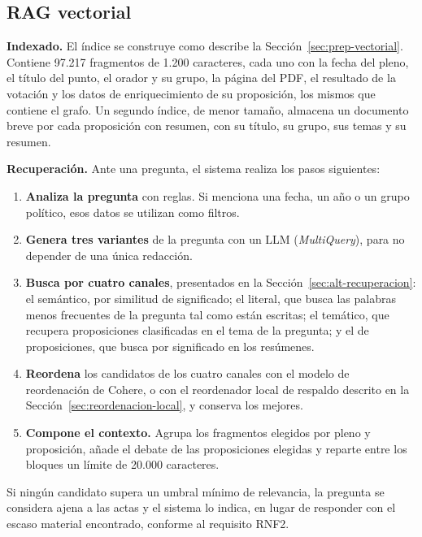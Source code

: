 \documentclass[11pt, a4paper]{report}
\begin{document}
	\subsection{RAG vectorial}
	\label{sec:rag-vectorial}

	\textbf{Indexado.} El índice se construye como describe la Sección~\ref{sec:prep-vectorial}. Contiene 97.217 fragmentos de 1.200 caracteres, cada uno con la fecha del pleno, el título del punto, el orador y su grupo, la página del PDF, el resultado de la votación y los datos de enriquecimiento de su proposición, los mismos que contiene el grafo. Un segundo índice, de menor tamaño, almacena un documento breve por cada proposición con resumen, con su título, su grupo, sus temas y su resumen.

	\textbf{Recuperación.} Ante una pregunta, el sistema realiza los pasos siguientes:

	\begin{enumerate}
		\item \textbf{Analiza la pregunta} con reglas. Si menciona una fecha, un
		año o un grupo político, esos datos se utilizan como filtros.
		\item \textbf{Genera tres variantes} de la pregunta con un LLM (\textit{MultiQuery}), para no depender de una única
		redacción.
		\item \textbf{Busca por cuatro canales}, presentados en la
		Sección~\ref{sec:alt-recuperacion}: el semántico, por similitud de
		significado; el literal, que busca las palabras menos frecuentes de la
		pregunta tal como están escritas; el temático, que recupera proposiciones
		clasificadas en el tema de la pregunta; y el de proposiciones, que busca
		por significado en los resúmenes.
		\item \textbf{Reordena} los candidatos de los cuatro canales con el modelo
		de reordenación de Cohere, o con el reordenador local de respaldo descrito
		en la Sección~\ref{sec:reordenacion-local}, y conserva los mejores.
		\item \textbf{Compone el contexto.} Agrupa los fragmentos elegidos por
		pleno y proposición, añade el debate de las proposiciones elegidas y
		reparte entre los bloques un límite de 20.000 caracteres.
	\end{enumerate}

	Si ningún candidato supera un umbral mínimo de relevancia, la pregunta se
	considera ajena a las actas y el sistema lo indica, en lugar de responder con
	el escaso material encontrado, conforme al requisito RNF2.
\end{document}
